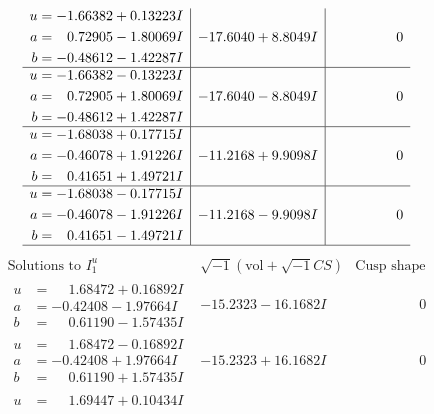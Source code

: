 \documentclass[1p]{elsarticle_modified}
\theoremstyle{definition}
\newcommand{\I}{\sqrt{-1}}
\begin{document}
$$\begin{array}{c|c|c}
\begin{aligned}
u &= -1.66382 + 0.13223 I \\
a &= \phantom{-}0.72905 - 1.80069 I \\
b &= -0.48612 - 1.42287 I\end{aligned}
 & -17.6040 + 8.8049 I & \phantom{-0.000000 } 0 \\ \hline\begin{aligned}
u &= -1.66382 - 0.13223 I \\
a &= \phantom{-}0.72905 + 1.80069 I \\
b &= -0.48612 + 1.42287 I\end{aligned}
 & -17.6040 - 8.8049 I & \phantom{-0.000000 } 0 \\ \hline\begin{aligned}
u &= -1.68038 + 0.17715 I \\
a &= -0.46078 + 1.91226 I \\
b &= \phantom{-}0.41651 + 1.49721 I\end{aligned}
 & -11.2168 + 9.9098 I & \phantom{-0.000000 } 0 \\ \hline\begin{aligned}
u &= -1.68038 - 0.17715 I \\
a &= -0.46078 - 1.91226 I \\
b &= \phantom{-}0.41651 - 1.49721 I\end{aligned}
 & -11.2168 - 9.9098 I & \phantom{-0.000000 } 0\\
 \hline 
 \end{array}$$\newpage$$\begin{array}{c|c|c}  
\text{Solutions to }I^u_{1}& \I (\text{vol} + \sqrt{-1}CS) & \text{Cusp shape}\\
 \hline 
\begin{aligned}
u &= \phantom{-}1.68472 + 0.16892 I \\
a &= -0.42408 - 1.97664 I \\
b &= \phantom{-}0.61190 - 1.57435 I\end{aligned}
 & -15.2323 - 16.1682 I & \phantom{-0.000000 } 0 \\ \hline\begin{aligned}
u &= \phantom{-}1.68472 - 0.16892 I \\
a &= -0.42408 + 1.97664 I \\
b &= \phantom{-}0.61190 + 1.57435 I\end{aligned}
 & -15.2323 + 16.1682 I & \phantom{-0.000000 } 0 \\ \hline\begin{aligned}
u &= \phantom{-}1.69447 + 0.10434 I \\

\end{aligned}
\end{array}$$
\end{document}

